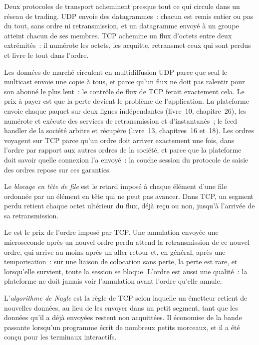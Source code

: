 Deux protocoles de transport acheminent presque tout ce qui circule dans un réseau de trading. UDP envoie des datagrammes~: chacun est remis entier
ou pas du tout, sans ordre ni retransmission, et un datagramme envoyé à un groupe atteint chacun de ses membres. TCP achemine un flux d'octets
entre deux extrémités~: il numérote les octets, les acquitte, retransmet ceux qui sont perdus
et livre le tout dans l'ordre.

Les données de marché circulent en multidiffusion UDP parce que seul le multicast envoie une copie à tous, et parce qu'un flux ne doit pas ralentir
pour son abonné le plus lent~: le contrôle de flux de TCP ferait exactement cela. Le prix à payer est que la perte devient le problème de l'application. La plateforme
envoie chaque paquet sur deux lignes indépendantes (livre~10, chapitre~26), les numérote et exécute des services de retransmission
et d'instantanés~; le feed handler de la société arbitre et récupère (livre~13, chapitres~16 et~18). Les ordres voyagent sur TCP parce qu'un ordre doit arriver
exactement une fois, dans l'ordre par rapport aux autres ordres de la société, et parce que la plateforme doit savoir quelle connexion l'a envoyé~: la couche session
du protocole de saisie des ordres repose sur ces garanties.

\begin{definition}\label{def:nw:networking-for-trading:hol}
Le \emph{blocage en tête de file} est le retard imposé à chaque élément d'une file ordonnée par un élément en tête
qui ne peut pas avancer. Dans TCP, un segment perdu retient chaque octet ultérieur du flux, déjà reçu ou non, jusqu'à
l'arrivée de sa retransmission.
\end{definition}

Le  est le prix de l'ordre imposé par TCP. Une annulation envoyée une microseconde après un nouvel ordre perdu attend la retransmission
de ce nouvel ordre, qui arrive au moins après un aller-retour et, en général, après une temporisation~: sur une liaison de colocation sans perte, la perte est rare,
et lorsqu'elle survient, toute la session se bloque. L'ordre est aussi une qualité~: la plateforme ne doit jamais voir l'annulation avant
l'ordre qu'elle annule.

\begin{definition}\label{def:nw:networking-for-trading:nagle}
L'\emph{algorithme de Nagle} est la règle de TCP selon laquelle un émetteur retient de nouvelles données, au lieu de les envoyer
dans un petit segment, tant que les données qu'il a déjà envoyées restent non acquittées. Il économise de la bande passante lorsqu'un programme écrit de nombreux petits morceaux,
et il a été conçu pour les terminaux interactifs.
\end{definition}

